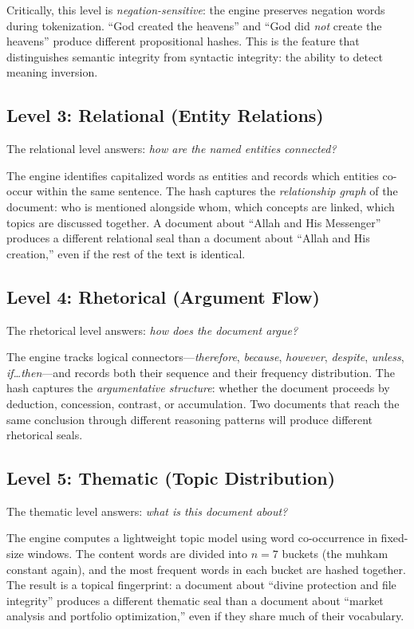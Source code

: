 \documentclass[11pt,a4paper]{article}
\begin{document}
Critically, this level is \textit{negation-sensitive}: the engine preserves negation words during tokenization. ``God created the heavens'' and ``God did \textit{not} create the heavens'' produce different propositional hashes. This is the feature that distinguishes semantic integrity from syntactic integrity: the ability to detect meaning inversion.

\subsection{Level 3: Relational (Entity Relations)}

The relational level answers: \textit{how are the named entities connected?}

The engine identifies capitalized words as entities and records which entities co-occur within the same sentence. The hash captures the \textit{relationship graph} of the document: who is mentioned alongside whom, which concepts are linked, which topics are discussed together. A document about ``Allah and His Messenger'' produces a different relational seal than a document about ``Allah and His creation,'' even if the rest of the text is identical.

\subsection{Level 4: Rhetorical (Argument Flow)}

The rhetorical level answers: \textit{how does the document argue?}

The engine tracks logical connectors---\textit{therefore}, \textit{because}, \textit{however}, \textit{despite}, \textit{unless}, \textit{if\ldots then}---and records both their sequence and their frequency distribution. The hash captures the \textit{argumentative structure}: whether the document proceeds by deduction, concession, contrast, or accumulation. Two documents that reach the same conclusion through different reasoning patterns will produce different rhetorical seals.

\subsection{Level 5: Thematic (Topic Distribution)}

The thematic level answers: \textit{what is this document about?}

The engine computes a lightweight topic model using word co-occurrence in fixed-size windows. The content words are divided into $n = 7$ buckets (the muhkam constant again), and the most frequent words in each bucket are hashed together. The result is a topical fingerprint: a document about ``divine protection and file integrity'' produces a different thematic seal than a document about ``market analysis and portfolio optimization,'' even if they share much of their vocabulary.
\end{document}
